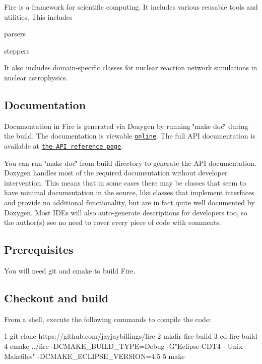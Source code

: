 Fire is a framework for scientific computing. It includes various reusable tools and utilities. This includes
\begin{DoxyItemize}
\item parsers
\item steppers
\end{DoxyItemize}

It also includes domain-\/specific classes for nuclear reaction network simulations in nuclear astrophysics.

\subsection*{Documentation}

Documentation in Fire is generated via Doxygen by running \char`\"{}make doc\char`\"{} during the build. The documentation is viewable \href{http://www.jayjaybillings.com/fire}{\tt online}. The full A\+P\+I documentation is available at \href{http://www.jayjaybillings.com/fire/api/html/}{\tt the A\+P\+I reference page}.

You can run \char`\"{}make doc\char`\"{} from build directory to generate the A\+P\+I documentation. Doxygen handles most of the required documentation without developer intervention. This means that in some cases there may be classes that seem to have minimal documentation in the source, like classes that implement interfaces and provide no additional functionality, but are in fact quite well documented by Doxygen. Most I\+D\+Es will also auto-\/generate descriptions for developers too, so the author(s) see no need to cover every piece of code with comments.

\subsection*{Prerequisites}

You will need git and cmake to build Fire.

\subsection*{Checkout and build}

From a shell, execute the following commands to compile the code\+:


\begin{DoxyCode}
1 git clone https://github.com/jayjaybillings/fire
2 mkdir fire-build
3 cd fire-build
4 cmake ../fire -DCMAKE\_BUILD\_TYPE=Debug -G"Eclipse CDT4 - Unix Makefiles" -DCMAKE\_ECLIPSE\_VERSION=4.5
5 make
\end{DoxyCode}


